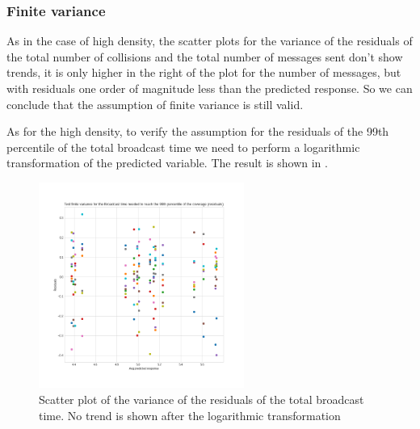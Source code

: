 \subsubsection{Finite variance}\label{ldassumptionsvariance}

As in the case of high density, the scatter plots for the variance of the
residuals of the total number of collisions and the total number of messages
sent don't show trends, it is only higher in the right of the plot for the
number of messages, but with residuals one order of magnitude less than the
predicted response. So we can conclude that the assumption of finite variance
is still valid.

As for the high density, to verify the assumption for the residuals of the 99th
percentile of the total broadcast time we need to perform a logarithmic
transformation of the predicted variable. The result is shown in
.

\begin{figure}[hbt]
	\centering
	\includegraphics[width=0.6\textwidth]{img/ld/broadcasttime-variance-transform}
	\caption{Scatter plot of the variance of the residuals of the total
	broadcast time. No trend is shown after the logarithmic
	transformation}\label{fig:ldtimevariance}
\end{figure}
